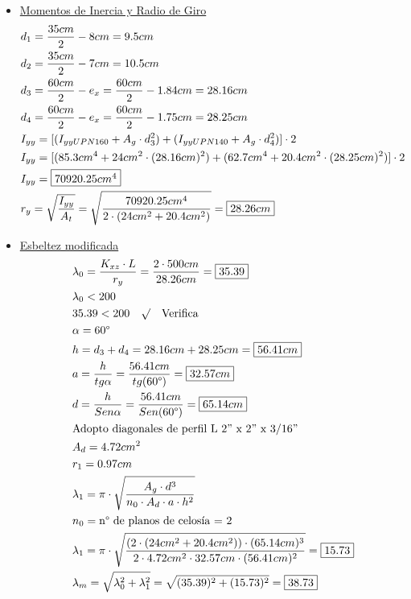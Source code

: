\begin{enumerate}
\begin{itemize}
\item \underline{Momentos de Inercia y Radio de Giro}
\begin{align*}
& d_1 = \frac{35cm}{2} - 8cm = 9.5cm\\
& d_2 = \frac{35cm}{2} - 7cm = 10.5cm\\
& d_3 = \frac{60cm}{2} - e_x = \frac{60cm}{2} - 1.84cm = 28.16cm\\
& d_4 = \frac{60cm}{2} - e_x = \frac{60cm}{2} - 1.75cm = 28.25cm\\
& I_{yy} = [(I_{yy UPN160}+A_g \cdot d_3^2)+ (I_{yy UPN140}+A_g \cdot d_4^2)] \cdot 2\\
& I_{yy} = [(85.3cm^4+24cm^2 \cdot (28.16cm)^2)+ (62.7cm^4+20.4cm^2 \cdot (28.25cm)^2)] \cdot 2 \\
& I_{yy} = \framebox{$70920.25cm^4$}\\
& r_y = \sqrt{\frac{I_{yy}}{A_t}} = \sqrt{\frac{70920.25cm^4}{2\cdot(24cm^2 + 20.4cm^2)}} = \framebox{$28.26cm$}
\end{align*}

\item \underline{Esbeltez modificada}
\begin{align*}
& \lambda_0 = \frac{K_{xz} \cdot L}{r_y} = \frac{2 \cdot 500cm}{28.26cm} = \framebox{$35.39$}\\
& \lambda_0 < 200 \\
& 35.39 < 200 \quad \surd \quad \text{Verifica} \\
& \alpha = 60\text{°}\\
& h = d_3 + d_4 = 28.16cm + 28.25cm = \framebox{$56.41cm$} \\
& a = \frac{h}{tg \alpha} = \frac{56.41cm}{tg(60\text{°})} = \framebox{$32.57cm$}\\
& d = \frac{h}{Sen\alpha} = \frac{56.41cm}{Sen(60\text{°})} = \framebox{$65.14cm$}\\
& \text{Adopto diagonales de perfil L 2” x 2” x 3/16”} \\
& A_d = 4.72cm^2 \\
& r_1 = 0.97cm \\
& \lambda_1 = \pi \cdot \sqrt{\frac{A_g \cdot d^3}{n_0 \cdot A_d \cdot a \cdot h^2}} \\
& n_0 = \text{n° de planos de celosía = 2} \\
& \lambda_1 = \pi \cdot \sqrt{\frac{(2\cdot(24cm^2+20.4cm^2)) \cdot (65.14cm)^3}{2 \cdot 4.72cm^2 \cdot 32.57cm \cdot (56.41cm)^2}} = \framebox{$15.73$}\\
& \lambda_m = \sqrt{\lambda_0^2 + \lambda_1^2} = \sqrt{(35.39)^2 + (15.73)^2} = \framebox{$38.73$}
\end{align*}


\end{itemize}
\end{enumerate}
